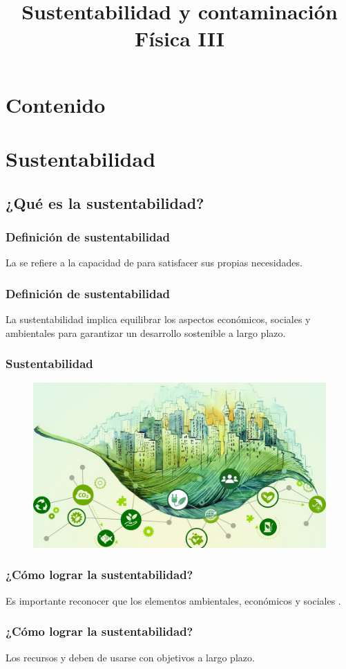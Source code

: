\documentclass[14pt]{beamer}
\title{\Large{Sustentabilidad y contaminación} \\ \normalsize{Física III}}
\date{}
\begin{document}
\maketitle

\section*{Contenido}

\section{Sustentabilidad}
\subsection{¿Qué es la sustentabilidad?}

\begin{frame}
\frametitle{Definición de sustentabilidad}
La  se refiere a la capacidad de  \pause {} para satisfacer sus propias necesidades.
\end{frame}
\begin{frame}
\frametitle{Definición de sustentabilidad}
La sustentabilidad implica equilibrar los aspectos económicos, sociales y ambientales para garantizar un desarrollo sostenible a largo plazo.
\end{frame}
\begin{frame}
\frametitle{Sustentabilidad}
\begin{figure}
    \centering
    \includegraphics[scale=0.25]{Imagenes/Sustentabilidad_01.jpg}
\end{figure}
\end{frame}
\begin{frame}
\frametitle{¿Cómo lograr la sustentabilidad?}
Es importante reconocer que los elementos ambientales, económicos y sociales .
\end{frame}
\begin{frame}
\frametitle{¿Cómo lograr la sustentabilidad?}
Los recursos  y deben de usarse con objetivos a largo plazo.
\end{frame}
\end{document}
